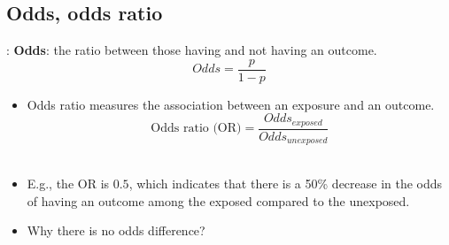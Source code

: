 \subsection{Odds, odds ratio}
\begin{frame}{\secname: \subsecname}
	\textbf{Odds}: the ratio between those having and not having an outcome. \[ Odds = \frac{p}{1-p}\]
	
\begin{itemize}
\item<2|handout:2-> Odds ratio measures the association between an exposure and an outcome.
\[\text{Odds ratio (OR)} = \frac{Odds_{exposed}}{Odds_{unexposed}}\] \\  \item<3|handout:3-> E.g., the OR is $0.5$, which indicates that there is a 50\% decrease in the odds of having an outcome among the exposed compared to the unexposed.
\item<4|handout:4> Why there is no odds difference?
\end{itemize}
\end{frame}


